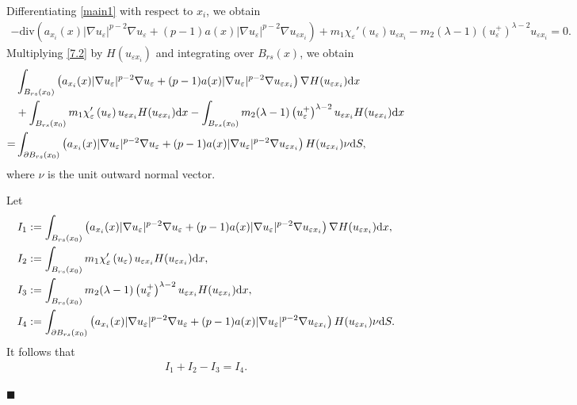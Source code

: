 \documentclass[onecolumn]{autart}
\newenvironment{proof}{{\it Proof: \enspace}}{\hfill $\blacksquare$\par}
\begin{document}
\begin{proof}
		
		Differentiating  \eqref{main1} with respect to $x_i$, we obtain
		\begin{align}\label{7.2}
			- \mathrm{div}\left(a_{x_i}(x) |\nabla u_\varepsilon|^{p-2} \nabla u_\varepsilon +(p-1) a(x)  |\nabla u_\varepsilon|^{p-2} \nabla u_{\varepsilon x_i}\right) +m_1 \chi_\varepsilon' \left( u_\varepsilon \right)u_{\varepsilon x_i} - m_2 (\lambda-1) \left(  u_{\varepsilon}^{+} \right) ^{\lambda-2}u_{\varepsilon x_i}=0.
		\end{align}
		Multiplying \eqref{7.2} by $H(u_{\varepsilon x_i})$ and integrating over $B_{rs}(x)$, we obtain
		\begin{align}
			&\int_{B_{rs}(x_0)}\left(a_{x_i}(x) |\nabla u_\varepsilon|^{p-2} \nabla u_\varepsilon +(p-1) a(x)  |\nabla u_\varepsilon|^{p-2} \nabla u_{\varepsilon x_i}\right)\nabla H(u_{\varepsilon x_i}) \mathrm{d}x
			\notag\\
			&+ \int_{B_{rs}(x_0)} m_1 \chi_\varepsilon' \left( u_\varepsilon \right)u_{\varepsilon x_i}H(u_{\varepsilon x_i})\mathrm{d}x - \int_{B_{rs}(x_0)}m_2 (\lambda-1) \left(  u_{\varepsilon}^{+} \right) ^{\lambda-2}u_{\varepsilon x_i}H(u_{\varepsilon x_i})\mathrm{d}x
			\notag\\=
			&\int_{\partial B_{ rs}(x_0)}\left(a_{x_i}(x) |\nabla u_\varepsilon|^{p-2} \nabla u_\varepsilon +(p-1) a(x)  |\nabla u_\varepsilon|^{p-2} \nabla u_{\varepsilon x_i}\right) H(u_{\varepsilon x_i})  \nu    \mathrm{d}S ,\notag
		\end{align}
		where $\nu$ is the unit outward normal vector.
		
		Let
		\begin{align}
			&I_1:=\int_{B_{rs}(x_0)}\left(a_{x_i}(x) |\nabla u_\varepsilon|^{p-2} \nabla u_\varepsilon +(p-1) a(x)  |\nabla u_\varepsilon|^{p-2} \nabla u_{\varepsilon x_i}\right)\nabla H(u_{\varepsilon x_i}) \mathrm{d}x,\notag\\
			&I_2:=\int_{B_{rs}(x_0)} m_1 \chi_\varepsilon' \left( u_\varepsilon \right)u_{\varepsilon x_i}H(u_{\varepsilon x_i})\mathrm{d}x,\notag\\
			&I_3:=\int_{B_{rs}(x_0)}m_2 (\lambda-1) \left(  u_{\varepsilon}^{+} \right) ^{\lambda-2}u_{\varepsilon x_i}H(u_{\varepsilon x_i})\mathrm{d}x,\notag\\
			&I_4:=\int_{\partial B_{ rs}(x_0)}\left(a_{x_i}(x) |\nabla u_\varepsilon|^{p-2} \nabla u_\varepsilon +(p-1) a(x)  |\nabla u_\varepsilon|^{p-2} \nabla u_{\varepsilon x_i}\right) H(u_{\varepsilon x_i})  \nu
			\mathrm{d}S .\notag
		\end{align}
		It follows that
		\begin{align}\label{7.3}
			I_1 + I_2 - I_3 = I_4.
		\end{align}
		

\end{proof}
\end{document}
